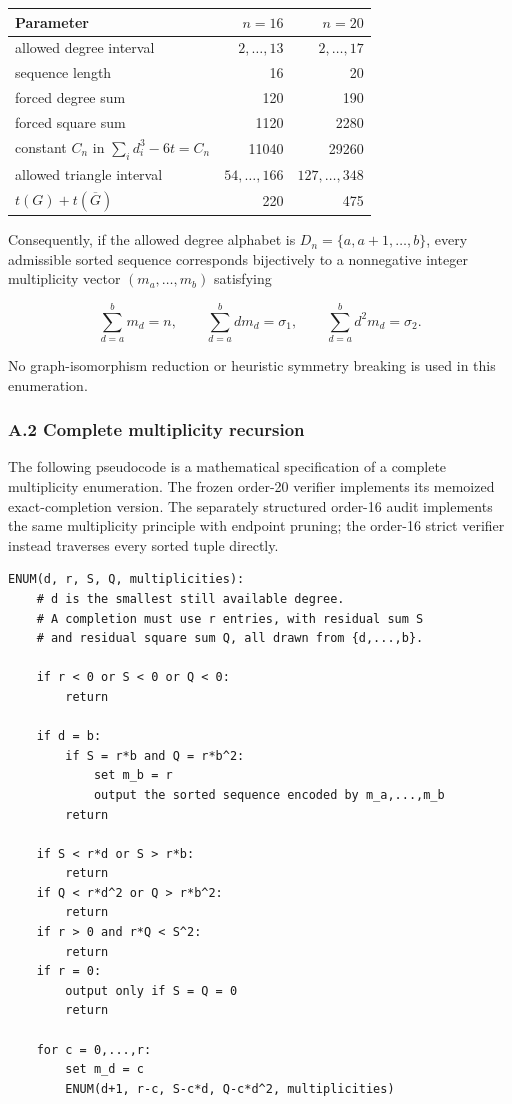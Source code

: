\documentclass[
  english,
  11pt,
  a4paper,
]{article}
\newcounter{none} %
\begin{document}
{\def\LTcaptype{none} %
\begin{longtable}[]{@{}lrr@{}}
\toprule\noalign{}
Parameter & \(n=16\) & \(n=20\) \\
\midrule\noalign{}
\endhead
\bottomrule\noalign{}
\endlastfoot
allowed degree interval & \(2,\ldots,13\) & \(2,\ldots,17\) \\
sequence length & 16 & 20 \\
forced degree sum & 120 & 190 \\
forced square sum & 1120 & 2280 \\
constant \(C_n\) in \(\sum_i d_i^3-6t=C_n\) & 11040 & 29260 \\
allowed triangle interval & \(54,\ldots,166\) & \(127,\ldots,348\) \\
\(t(G)+t(\overline G)\) & 220 & 475 \\
\end{longtable}
}

Consequently, if the allowed degree alphabet is
\(D_n=\{a,a+1,\ldots,b\}\), every admissible sorted sequence corresponds
bijectively to a nonnegative integer multiplicity vector
\((m_a,\ldots,m_b)\) satisfying

\[
\sum_{d=a}^{b}m_d=n,
\qquad
\sum_{d=a}^{b}d m_d=\sigma_1,
\qquad
\sum_{d=a}^{b}d^2m_d=\sigma_2.
\tag{A.1}
\]

No graph-isomorphism reduction or heuristic symmetry breaking is used in
this enumeration.

\subsubsection{A.2 Complete multiplicity
recursion}\label{a.2-complete-multiplicity-recursion}

The following pseudocode is a mathematical specification of a complete
multiplicity enumeration. The frozen order-20 verifier implements its
memoized exact-completion version. The separately structured order-16
audit implements the same multiplicity principle with endpoint pruning;
the order-16 strict verifier instead traverses every sorted tuple
directly.

\begin{verbatim}
ENUM(d, r, S, Q, multiplicities):
    # d is the smallest still available degree.
    # A completion must use r entries, with residual sum S
    # and residual square sum Q, all drawn from {d,...,b}.

    if r < 0 or S < 0 or Q < 0:
        return

    if d = b:
        if S = r*b and Q = r*b^2:
            set m_b = r
            output the sorted sequence encoded by m_a,...,m_b
        return

    if S < r*d or S > r*b:
        return
    if Q < r*d^2 or Q > r*b^2:
        return
    if r > 0 and r*Q < S^2:
        return
    if r = 0:
        output only if S = Q = 0
        return

    for c = 0,...,r:
        set m_d = c
        ENUM(d+1, r-c, S-c*d, Q-c*d^2, multiplicities)
\end{verbatim}
\end{document}
